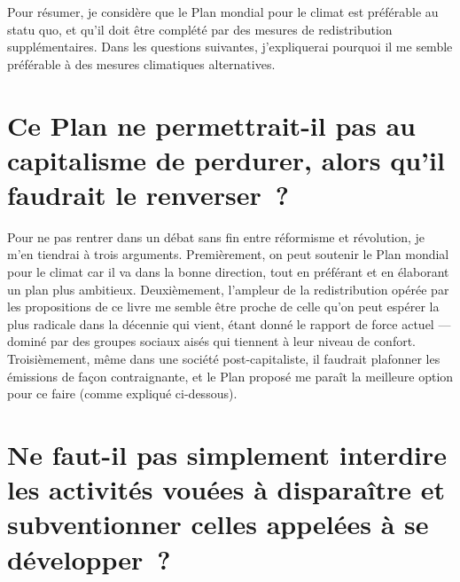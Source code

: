 \documentclass[a5paper,french]{memoir}
\begin{document}
Pour résumer, je considère que le Plan mondial pour le climat est préférable au statu quo, et qu'il doit être complété par des mesures de redistribution supplémentaires. Dans les questions suivantes, j'expliquerai pourquoi il me semble préférable à des mesures climatiques alternatives. 


\section*{\normalsize Ce Plan ne permettrait-il pas au capitalisme de perdurer, alors qu'il faudrait le renverser~?}\label{q:capitalisme}

Pour ne pas rentrer dans un débat sans fin entre réformisme et révolution, je m'en tiendrai à trois arguments. Premièrement, on peut soutenir le Plan mondial pour le climat car il va dans la bonne direction, tout en préférant et en élaborant un plan plus ambitieux. Deuxièmement, l'ampleur de la redistribution opérée par les propositions de ce livre me semble être proche de celle qu'on peut espérer la plus radicale dans la décennie qui vient, étant donné le rapport de force actuel --- dominé par des groupes sociaux aisés qui tiennent à leur niveau de confort. %
Troisièmement, même dans une société post-capitaliste, il faudrait plafonner les émissions de façon contraignante, et le Plan proposé me paraît la meilleure option pour ce faire (comme expliqué ci-dessous). 

\section*{\normalsize Ne faut-il pas simplement %
interdire les activités vouées à disparaître et subventionner celles appelées à se développer~?}\label{q:interdiction}
\end{document}
